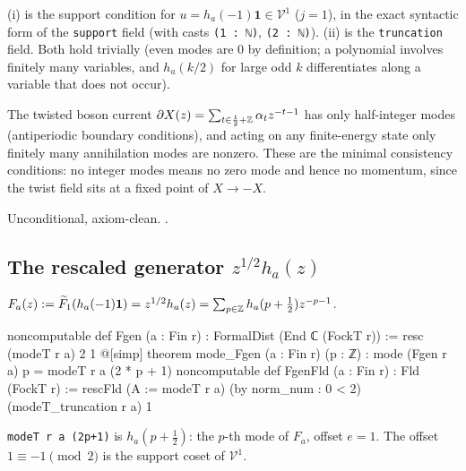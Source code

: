 \begin{dictionary}
(i) is the support condition for $u = h_a(-1)\mathbf 1\in\mathcal V^1$ ($j=1$), in the exact
syntactic form of the \verb|support| field (with casts \verb|(1 : ℕ)|, \verb|(2 : ℕ)|).
(ii) is the \verb|truncation| field. Both hold trivially (even modes are $0$ by definition; a
polynomial involves finitely many variables, and $h_a(k/2)$ for large odd $k$ differentiates
along a variable that does not occur).
\end{dictionary}

\begin{physics}
The twisted boson current $\partial X(z)=\sum_{t\in\frac12+{\mathbb{Z}}}\alpha_tz^{-t-1}$ has only half-integer modes (antiperiodic boundary conditions), and acting on any finite-energy state only finitely many annihilation modes are nonzero. These are the minimal consistency conditions: no integer modes means no zero mode and hence no momentum, since the twist field sits at a fixed point of $X\to-X$.
\end{physics}

\begin{status}
Unconditional, axiom-clean. .
\end{status}

\subsection{The rescaled generator \texorpdfstring{$z^{1/2}h_a(z)$}{z^(1/2)h(z)}}

\begin{definition}\label{ch07:def:Fgen}
$F_a(z) := \widetilde{F}_1(h_a(-1)\mathbf 1) = z^{1/2}h_a(z) = \sum_{p\in{\mathbb{Z}}}h_a(p+\tfrac12)z^{-p-1}$.
\end{definition}

\begin{leancode}
noncomputable def Fgen (a : Fin r) : FormalDist (End ℂ (FockT r)) := resc (modeT r a) 2 1
@[simp] theorem mode_Fgen (a : Fin r) (p : ℤ) : mode (Fgen r a) p = modeT r a (2 * p + 1)
noncomputable def FgenFld (a : Fin r) : Fld (FockT r) :=
  rescFld (A := modeT r a) (by norm_num : 0 < 2) (modeT_truncation r a) 1
\end{leancode}

\begin{dictionary}
\verb|modeT r a (2p+1)| is $h_a(p+\frac12)$: the $p$-th mode of $F_a$, offset $e=1$. The
offset $1\equiv -1\pmod2$ is the support coset of $\mathcal V^1$.
\end{dictionary}

